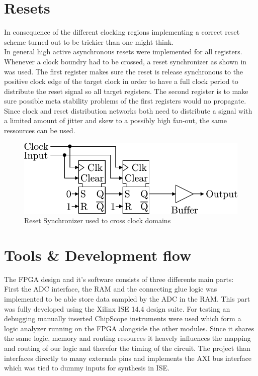 \section{Resets}
\label{sec:fpga_reset}

In consequence of the different clocking regions implementing a correct
reset scheme turned out to be trickier than one might think. \\

In general high active asynchronous resets were implemented for all
registers. Whenever a clock boundry had to be crossed, a reset synchronizer
as shown in  was used. The first register
makes sure the reset is release synchronous to the positive clock edge
of the target clock in order to have a full clock period to distribute
the reset signal so all target registers. The second register is
to make sure possible meta stability problems of the first registers would
no propagate. Since clock and reset distribution networks both need to
distribute a signal with a limited amount of jitter and skew to a possibly
high fan-out, the same ressources can be used.  \\

\begin{figure}
  \centering
  \includegraphics{figures/RstSync}
  \caption{Reset Synchronizer used to cross clock domains}
  \label{fig:fpga_rst_sync}
\end{figure}


\section{Tools \& Development flow}
\label{sec:fpga_tools}

The \gls{FPGA} design and it's software consists of three differents
main parts: \\

First the \gls{ADC} interface, the \gls{RAM} and the connecting
glue logic was implemented to be able store data sampled by the \gls{ADC}
in the \gls{RAM}. This part was fully developed using the Xilinx ISE 14.4
design suite. For testing an debugging manually inserted ChipScope
instruments were used which form a logic analyzer running on the \gls{FPGA}
alongside the other modules. Since it shares the same logic, memory and
routing resources it heavely influences the mapping and routing of our
logic and therefor the timing of the circuit. The project than interfaces
directly to many externals pins and implements the \gls{AXI} bus interface
which was tied to dummy inputs for synthesis in ISE. \\

